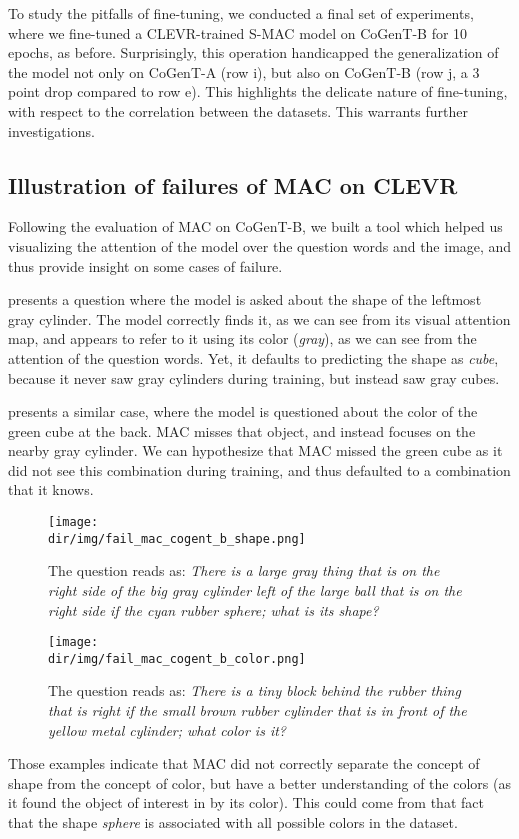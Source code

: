 To study the pitfalls of fine-tuning, we conducted a final set of experiments, where we fine-tuned a CLEVR-trained S-MAC model on CoGenT-B for 10 epochs, as before. Surprisingly, this operation handicapped the generalization of the model not only on CoGenT-A (row i), but also on CoGenT-B (row j, a 3 point drop compared to row e). This highlights the delicate nature of fine-tuning, with respect to the correlation between the datasets. This warrants further investigations.


\subsection{Illustration of failures of MAC on CLEVR}
\label{sec:failures}

Following the evaluation of MAC on CoGenT-B, we built a tool which helped us visualizing the attention of the model over the question words and the image, and thus provide insight on some cases of failure.

 presents a question where the model is asked about the shape of the leftmost gray cylinder. The model correctly finds it, as we can see from its visual attention map, and appears to refer to it using its color (\textit{gray}), as we can see from the attention of the question words. Yet, it defaults to predicting the shape as \textit{cube}, because it never saw gray cylinders during training, but instead saw gray cubes.

 presents a similar case, where the model is questioned about the color of the green cube at the back. MAC misses that object, and instead focuses on the nearby gray cylinder. We can hypothesize that MAC missed the green cube as it did not see this combination during training, and thus defaulted to a combination that it knows.


\begin{figure}[htbp]
	\centering
	\texttt{[image: \\dir/img/fail\_mac\_cogent\_b\_shape.png]}
	\caption{The question reads as: \textit{There is a large gray thing that is on the right side of the big gray cylinder left of the large ball that is on the right side if the cyan rubber sphere; what is its shape?}}
	\label{fig:fail_mac_shape}
\end{figure}

\begin{figure}[htbp]
	\centering
	\texttt{[image: \\dir/img/fail\_mac\_cogent\_b\_color.png]}
	\caption{The question reads as: \textit{There is a tiny block behind the rubber thing that is right if the small brown rubber cylinder that is in front of the yellow metal cylinder; what color is it?}}
	\label{fig:fail_mac_color}
\end{figure}

Those examples indicate that MAC did not correctly separate the concept of shape from the concept of color, but have a better understanding of the colors (as it found the object of interest in  by its color). This could come from that fact that the shape \textit{sphere} is associated with all possible colors in the dataset. 
